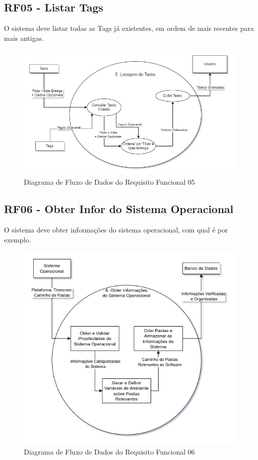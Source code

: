 \documentclass[a4paper,12pt]{article}
\begin{document}
\pagebreak
\subsection{RF05 - Listar Tags}
O sistema deve listar todas as {Tags} já existentes, em ordem de mais recentes para mais antigas.
\begin{figure}[H]
	\centering
	\includegraphics[scale=0.45]{DFDs/RF05.drawio.png}
	\caption{Diagrama de Fluxo de Dados do Requisito Funcional 05}
\end{figure}

\pagebreak
\subsection{RF06 - Obter Infor do Sistema Operacional}
O sistema deve obter informações do sistema operacional, com qual é por exemplo.
\begin{figure}[H]
	\centering
	\includegraphics[scale=0.45]{DFDs/RF06.drawio.png}
	\caption{Diagrama de Fluxo de Dados do Requisito Funcional 06}
\end{figure}
\end{document}
